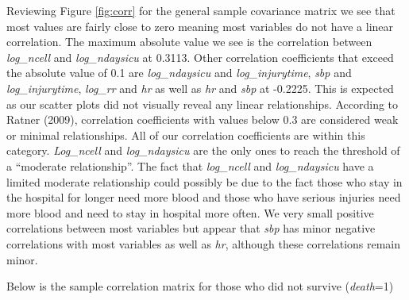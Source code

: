 \documentclass[
]{article}
\begin{document}
Reviewing Figure \ref{fig:corr} for the general sample covariance matrix
we see that most values are fairly close to zero meaning most variables
do not have a linear correlation. The maximum absolute value we see is
the correlation between \emph{log\_ncell} and \emph{log\_ndaysicu} at
0.3113. Other correlation coefficients that exceed the absolute value of
0.1 are \emph{log\_ndaysicu} and \emph{log\_injurytime}, \emph{sbp} and
\emph{log\_injurytime}, \emph{log\_rr} and \emph{hr} as well as
\emph{hr} and \emph{sbp} at -0.2225. This is expected as our scatter
plots did not visually reveal any linear relationships. According to
Ratner (2009), correlation coefficients with values below 0.3 are
considered weak or minimal relationships. All of our correlation
coefficients are within this category. \emph{Log\_ncell} and
\emph{log\_ndaysicu} are the only ones to reach the threshold of a
``moderate relationship''. The fact that \emph{log\_ncell} and
\emph{log\_ndaysicu} have a limited moderate relationship could possibly
be due to the fact those who stay in the hospital for longer need more
blood and those who have serious injuries need more blood and need to
stay in hospital more often. We very small positive correlations between
most variables but appear that \emph{sbp} has minor negative
correlations with most variables as well as \emph{hr}, although these
correlations remain minor.

Below is the sample correlation matrix for those who did not survive
(\emph{death}=1)
\end{document}
